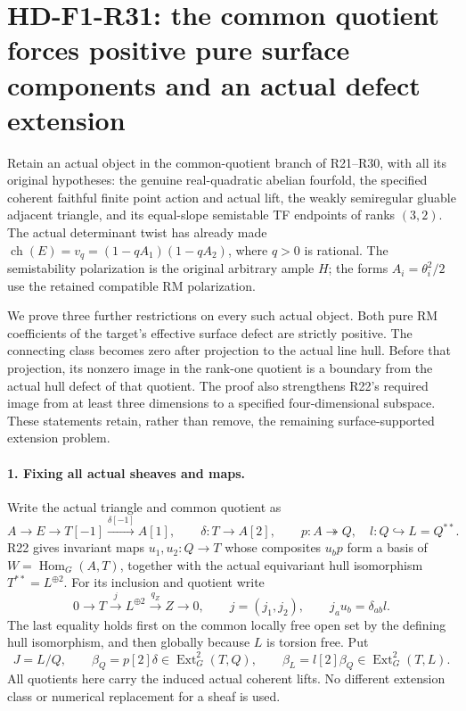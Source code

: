 \section[HD-F1-R31: the pure surface cancellation]{HD-F1-R31: the common quotient forces positive pure surface components and an actual defect extension}
\label{sec:followup-rm-pure-surface-cancellation}

Retain an actual object in the common-quotient branch
of R21--R30, with all its original hypotheses:
the genuine real-quadratic abelian fourfold, the
specified coherent faithful finite point action
and actual lift, the weakly semiregular gluable
adjacent triangle, and its equal-slope semistable
TF endpoints of ranks $(3,2)$. The actual
determinant twist has already made
$\operatorname{ch}(E)=v_q=(1-qA_1)(1-qA_2)$,
where $q>0$ is rational. The semistability
polarization is the original arbitrary ample $H$;
the forms $A_i=\theta_i^2/2$ use the retained
compatible RM polarization.

We prove three further restrictions on every
such actual object. Both pure RM coefficients
of the target's effective surface defect are
strictly positive. The connecting class becomes
zero after projection to the actual line hull.
Before that projection, its nonzero image in
the rank-one quotient is a boundary from the
actual hull defect of that quotient. The proof
also strengthens R22's required image from
at least three dimensions to a specified
four-dimensional subspace. These statements
retain, rather than remove, the remaining
surface-supported extension problem.

\paragraph{1. Fixing all actual sheaves and maps.}
Write the actual triangle and common quotient as
\[
 A\longrightarrow E\longrightarrow T[-1]
       \xrightarrow{\delta[-1]}A[1],\qquad
 \delta:T\longrightarrow A[2],\qquad
 p:A\twoheadrightarrow Q,\quad l:Q\hookrightarrow L=Q^{**}.
 \tag{F1R31.1}
\]
R22 gives invariant maps $u_1,u_2:Q\to T$
whose composites $u_bp$ form a basis of
$W=\operatorname{Hom}_G(A,T)$, together with
the actual equivariant hull isomorphism
$T^{**}=L^{\oplus2}$. For its inclusion and
quotient write
\[
 0\longrightarrow T\xrightarrow{j}L^{\oplus2}
       \xrightarrow{q_Z}Z\longrightarrow0,
 \qquad j=(j_1,j_2),\qquad j_a u_b=\delta_{ab}l.
 \tag{F1R31.2}
\]
The last equality holds first on the common
locally free open set by the defining hull
isomorphism, and then globally because $L$
is torsion free. Put
\[
 J=L/Q,\qquad
 \beta_Q=p[2]\delta\in\operatorname{Ext}^2_G(T,Q),
 \qquad \beta_L=l[2]\beta_Q\in\operatorname{Ext}^2_G(T,L).
 \tag{F1R31.3}
\]
All quotients here carry the induced actual
coherent lifts. No different extension class
or numerical replacement for a sheaf is used.

